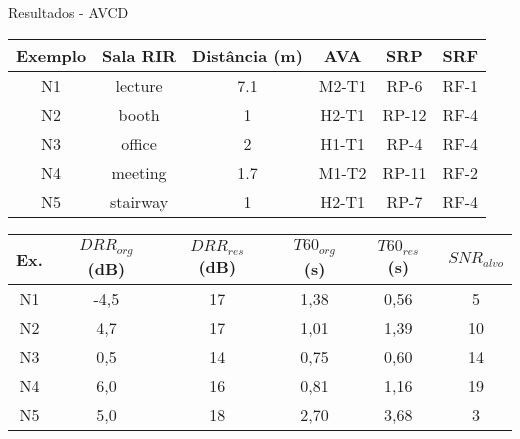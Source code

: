 
\begin{frame}{Resultados - AVCD}
    \begin{table} [H]
        \centering
        \begin{tabular}{c|c|c|c|c|c}
    
            \textbf{Exemplo} & 
            \textbf{Sala RIR} & 
            \textbf{Distância (m)} &
            \textbf{AVA} &
            \textbf{SRP} &
            \textbf{SRF} \\
            \hline 
    
            N1 & lecture & 7.1 & M2-T1 & RP-6 & RF-1 \\
            N2 & booth & 1 & H2-T1 & RP-12 & RF-4 \\
            N3 & office & 2 & H1-T1 & RP-4 & RF-4 \\
            N4 & meeting & 1.7 & M1-T2 & RP-11 & RF-2 \\
            N5 & stairway & 1 & H2-T1 & RP-7 & RF-4 \\
    
        \end{tabular}
        \bigbreak
        \bigbreak
        \begin{tabular}{c|c|c|c|c|c}
    
            \textbf{Ex.} & 
            \textbf{$DRR_{org}$ (dB)} & 
            \textbf{$DRR_{res}$ (dB)} & 
            \textbf{$T60_{org}$ (s)} & 
            \textbf{$T60_{res}$ (s)} &
            \textbf{$SNR_{alvo}$} \\
            \hline 
    
            N1 & -4,5 & 17 & 1,38 & 0,56 & 5 \\
            N2 & 4,7 & 17 & 1,01 & 1,39 & 10 \\
            N3 & 0,5 & 14 & 0,75 & 0,60 & 14 \\
            N4 & 6,0 & 16 & 0,81 & 1,16 & 19 \\
            N5 & 5,0 & 18 & 2,70 & 3,68 & 3 \\
    
        \end{tabular}
    \end{table}
\end{frame}


